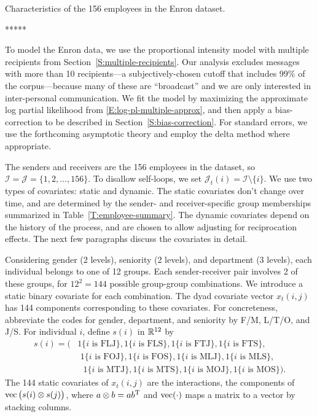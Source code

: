 \documentclass[aoas,preprint]{imsart}
\begin{document}
\begin{table}[h]
    
    \caption{
        Characteristics of the 156 employees in the Enron dataset.
    }
    \label{T:employee-summary}
\end{table}

*****

To model the Enron data, we use the proportional intensity model with multiple
recipients from Section~\ref{S:multiple-recipients}.  Our analysis excludes
messages with more than 10 recipients---a
subjectively-chosen cutoff that includes 99\% of the corpus---because many of
these are ``broadcast'' and we are only interested in inter-personal
communication.  We fit the model by maximizing the approximate log partial
likelihood from \eqref{E:log-pl-multiple-approx}, and then apply
a bias-correction to be described in Section~\ref{S:bias-correction}.  For standard
errors, we use the forthcoming asymptotic theory and employ the delta method where
appropriate.

The senders and receivers are the 156 employees in the dataset, so
$\mathcal{I} = \mathcal{J} = \{ 1, 2, \ldots, 156 \}$.  To disallow
self-loops, we set $\mathcal{J}_t(i) = \mathcal{I} \setminus \{ i \}$.
We use two types of covariates: static and dynamic.  The static covariates
don't change over time, and are determined by the sender- and
receiver-specific group memberships summarized in
Table~\ref{T:employee-summary}.  The dynamic covariates depend on the
history of the process, and are chosen to allow adjusting for reciprocation
effects.  The next few paragraphs discuss the covariates in detail.

Considering gender (2 levels), seniority (2 levels), and department
(3 levels), each individual belongs to one of 12 groups.  Each
sender-receiver pair involves 2 of these groups, for $12^2 = 144$ possible
group-group combinations.  We introduce a static binary covariate for each
combination.  The dyad covariate vector $x_t(i,j)$ has 144 components
corresponding to these covariates.  For concreteness, abbreviate the codes
for gender, department, and seniority by F/M, L/T/O, and J/S.  For
individual $i$, define $s(i)$ in $\mathbb{R}^{12}$ by
\begin{align*}
    s(i)
    =
    \big(
        &\text{1\{$i$ is FLJ\}},
        \text{1\{$i$ is FLS\}},
        \text{1\{$i$ is FTJ\}},
        \text{1\{$i$ is FTS\}}, \\
        &\,\,\text{1\{$i$ is FOJ\}},
        \text{1\{$i$ is FOS\}},
        \text{1\{$i$ is MLJ\}},
        \text{1\{$i$ is MLS\}}, \\
        &\,\,\,\,\text{1\{$i$ is MTJ\}},
        \text{1\{$i$ is MTS\}},
        \text{1\{$i$ is MOJ\}},
        \text{1\{$i$ is MOS\}}
    \big).
\end{align*}
The 144 static covariates of $x_t(i,j)$ are the interactions,
the components of $\operatorname*{vec}\big(s(i) \otimes s(j)\big)$, where
$a \otimes b = a b^{\mathrm{T}}$ and $\operatorname*{vec}(\cdot)$ maps a matrix to a vector
by stacking columns.
\end{document}

